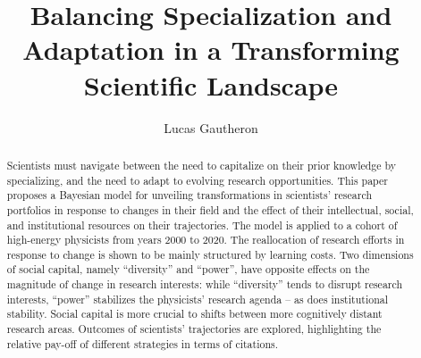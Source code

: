 \documentclass{article}
\title{Balancing Specialization and Adaptation in a Transforming Scientific Landscape}
\author{Lucas Gautheron}
\date{}
\begin{document}
\maketitle

\begin{abstract}
    Scientists must navigate between the need to capitalize on their prior knowledge by specializing, and the need to adapt to evolving research opportunities. This paper proposes a Bayesian model for unveiling transformations in scientists' research portfolios in response to changes in their field and the effect of their intellectual, social, and institutional resources on their trajectories. The model is applied to a cohort of high-energy physicists from years 2000 to 2020. %
    The reallocation of research efforts in response to change is shown to be mainly structured by learning costs. Two dimensions of social capital, namely ``diversity'' and ``power'', have opposite effects on the magnitude of change in research interests: while ``diversity'' tends to disrupt research interests, ``power'' stabilizes the physicists' research agenda -- as does institutional stability. Social capital is more crucial to shifts between more cognitively distant research areas. Outcomes of scientists' trajectories are explored, highlighting the relative pay-off of different strategies in terms of citations.
\end{abstract}






\end{document}
